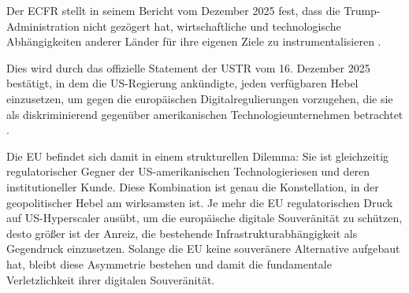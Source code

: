 Der \ac{ECFR} stellt in 
seinem Bericht vom Dezember 2025 fest, dass die Trump-Administration 
nicht gezögert hat, wirtschaftliche und technologische Abhängigkeiten 
anderer Länder für ihre eigenen Ziele zu instrumentalisieren \cite{ecfr2025eurostack}.

Dies wird durch das offizielle Statement der \ac{USTR} vom 16. Dezember 2025 bestätigt, in dem die US-Regierung 
ankündigte, jeden verfügbaren Hebel einzusetzen, um gegen die 
europäischen Digitalregulierungen vorzugehen, die sie als 
diskriminierend gegenüber amerikanischen Technologieunternehmen 
betrachtet \cite{ustr2025digital}. 

Die \ac{EU} befindet sich damit in einem strukturellen Dilemma: Sie ist 
gleichzeitig regulatorischer Gegner der US-amerikanischen Technologieriesen und 
deren institutioneller Kunde. Diese Kombination ist genau die 
Konstellation, in der geopolitischer Hebel am wirksamsten ist. Je mehr 
die \ac{EU} regulatorischen Druck auf US-Hyperscaler ausübt, um die 
europäische digitale Souveränität zu schützen, desto größer 
ist der Anreiz, die bestehende Infrastrukturabhängigkeit als 
Gegendruck einzusetzen. Solange die \ac{EU} keine souveränere 
Alternative aufgebaut hat, bleibt diese Asymmetrie bestehen und 
damit die fundamentale Verletzlichkeit ihrer digitalen Souveränität.